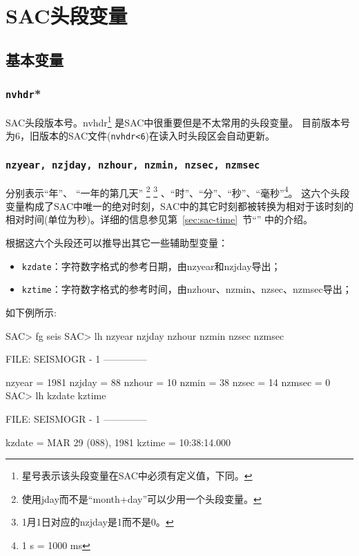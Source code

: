 \section{SAC头段变量}
\label{sec:sac-header-variables}

\subsection{基本变量}

\subsubsection{\texttt{nvhdr}*}
SAC头段版本号。nvhdr\footnote{星号表示该头段变量在SAC中必须有定义值，下同。}
是SAC中很重要但是不太常用的头段变量。
目前版本号为6，旧版本的SAC文件(\texttt{nvhdr<6})在读入时头段区会自动更新。

\subsubsection{\texttt{nzyear, nzjday, nzhour, nzmin, nzsec, nzmsec}}
分别表示``年''、
``一年的第几天''
\footnote{使用jday而不是``month+day''可以少用一个头段变量。}
\footnote{1月1日对应的nzjday是1而不是0。}
、``时''、``分''、``秒''、``毫秒''\footnote{1 s = 1000 ms}。
这六个头段变量构成了SAC中唯一的绝对时刻，SAC中的其它时刻都被转换为相对于该时刻的
相对时间(单位为秒)。详细的信息参见第~\ref{sec:sac-time}~节``''
中的介绍。

根据这六个头段还可以推导出其它一些辅助型变量：
\begin{itemize}
\item \texttt{kzdate}：字符数字格式的参考日期，由nzyear和nzjday导出；
\item \texttt{kztime}：字符数字格式的参考时间，由nzhour、nzmin、nzsec、nzmsec导出；
\end{itemize}

如下例所示:
\begin{SACCode}
SAC> fg seis
SAC> lh nzyear nzjday nzhour nzmin nzsec nzmsec

  FILE: SEISMOGR - 1
 --------------

     nzyear = 1981
     nzjday = 88
     nzhour = 10
      nzmin = 38
      nzsec = 14
     nzmsec = 0
SAC> lh kzdate kztime

  FILE: SEISMOGR - 1
 --------------

     kzdate = MAR 29 (088), 1981
     kztime = 10:38:14.000
\end{SACCode}

